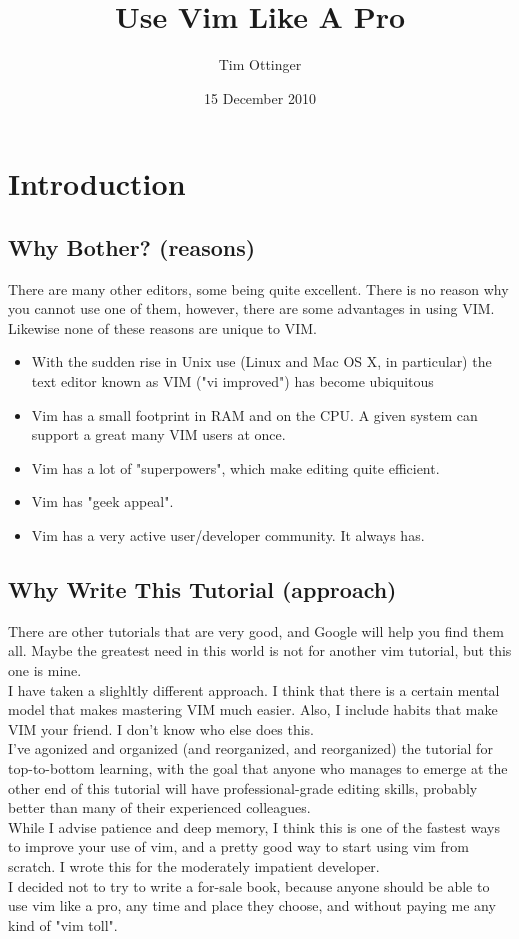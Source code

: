 \documentclass[a4paper, 12pt]{article}
\title{Use Vim Like A Pro}
\author{Tim Ottinger}
\date{15 December 2010}
\begin{document}
\section{Introduction}
\label{"Introduction"}
\subsection{Why Bother? (reasons)}
\label{"Why Bother? (reasons)"}
There are many other editors, some being quite excellent. There is no reason why you cannot use one of them, however, there are some advantages in using VIM. Likewise none of these reasons are unique to VIM.\\
\begin{itemize}
\item With the sudden rise in Unix use (Linux and Mac OS X, in particular) the text editor known as VIM ("vi improved") has become ubiquitous
\item Vim has a small footprint in RAM and on the CPU. A given system can support a great many VIM users at once.
\item Vim has a lot of "superpowers", which make editing quite efficient.
\item Vim has "geek appeal".
\item Vim has a very active user/developer community. It always has.
\end{itemize}

\subsection{Why Write This Tutorial (approach)}
\label{"Why Write This Tutorial (approach)"}
There are other tutorials that are very good, and Google will help you find them all. Maybe the greatest need in this world is not for another vim tutorial, but this one is mine. \\
I have taken a slighltly different approach. I think that there is a certain mental model that makes mastering VIM much easier. Also, I include habits that make VIM your friend. I don't know who else does this. \\
I've agonized and organized (and reorganized, and reorganized) the tutorial for top-to-bottom learning, with the goal that anyone who manages to emerge at the other end of this tutorial will have professional-grade editing skills, probably better than many of their experienced colleagues.\\
While I advise patience and deep memory, I think this is one of the fastest ways to improve your use of vim, and a pretty good way to start using vim from scratch. I wrote this for the moderately impatient developer.\\
I decided not to try to write a for-sale book, because anyone should be able to use vim like a pro, any time and place they choose, and without paying me any kind of "vim toll".\\
\end{document}
